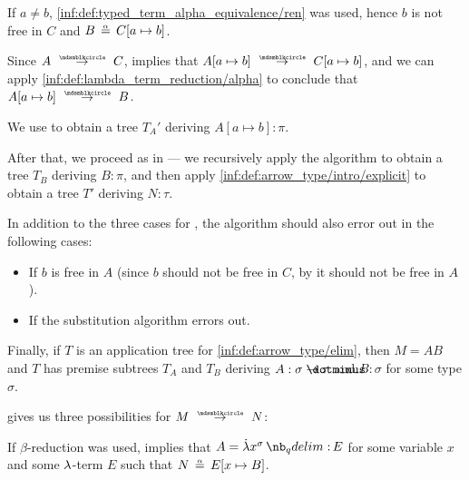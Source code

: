\begin{algorithm}
\begin{thmenum}
\begin{thmenum}
\begin{thmenum}
         If \( a \neq b \), \ref{inf:def:typed_term_alpha_equivalence/ren} was used, hence \( b \) is not free in \( C \) and \( B \aequiv C[a \mapsto b] \).

        Since \( A \pred C \),  implies that \( A[a \mapsto b] \pred C[a \mapsto b] \), and we can apply \ref{inf:def:lambda_term_reduction/alpha} to conclude that \( A[a \mapsto b] \pred B \).

        We use  to obtain a tree \( T_A' \) deriving \( A[a \mapsto b]: \pi \).

        After that, we proceed as in  --- we recursively apply the algorithm to obtain a tree \( T_B \) deriving \( B: \pi \), and then apply \ref{inf:def:arrow_type/intro/explicit} to obtain a tree \( T' \) deriving \( N: \tau \).

        In addition to the three cases for , the algorithm should also error out in the following cases:
        \begin{itemize}
          \item If \( b \) is free in \( A \) (since \( b \) should not be free in \( C \), by  it should not be free in \( A \)).
          \item If the substitution algorithm errors out.
        \end{itemize}
      \end{thmenum}
    \end{thmenum}

     Finally, if \( T \) is an application tree for \ref{inf:def:arrow_type/elim}, then \( M = AB \) and \( T \) has premise subtrees \( T_A \) and \( T_B \) deriving \( A: \sigma \synimplies \tau \) and \( B: \sigma \) for some type \( \sigma \).

     gives us three possibilities for \( M \pred N \):
    \begin{thmenum}
       If \( \beta \)-reduction was used,  implies that \( A = \qabs {x^\sigma} E \) for some variable \( x \) and some \( {\mathrm \lambda} \)-term \( E \) such that \( N \aequiv E[x \mapsto B] \).


\end{thmenum}
\end{thmenum}
\end{algorithm}
